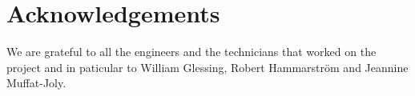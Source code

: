 \section{Acknowledgements}

We are grateful to all the engineers and the technicians that worked on
the project and in paticular to William Glessing, Robert Hammarstr\"om
and Jeannine Muffat-Joly.